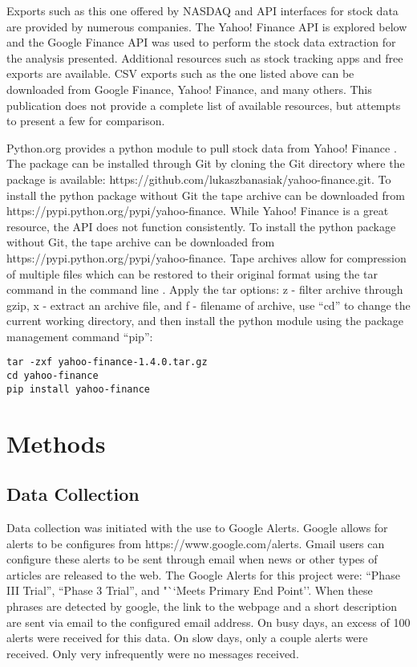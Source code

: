 \documentclass[sigconf]{acmart}
\begin{document}
Exports such as this one offered by NASDAQ and API interfaces for stock data are provided by numerous companies. The Yahoo! Finance API is explored below and the Google Finance API was used to perform the stock data extraction for the analysis presented. Additional resources such as stock tracking apps and free exports are available. CSV exports such as the one listed above can be downloaded from Google Finance, Yahoo! Finance, and many others. This publication does not provide a complete list of available resources, but attempts to present a few for comparison. 

Python.org provides a python module to pull stock data from Yahoo! Finance \cite{www-python-yahoo}. The package can be installed through Git by cloning the Git directory where the package is available: https://github.com/lukaszbanasiak/yahoo-finance.git. To install the python package without Git the tape archive can be downloaded from https://pypi.python.org/pypi/yahoo-finance. While Yahoo! Finance is a great resource, the API does not function consistently. To install the python package without Git, the tape archive can be downloaded from https://pypi.python.org/pypi/yahoo-finance. Tape archives allow for compression of multiple files which can be restored to their original format using the tar command in the command line \cite{www-tar}.  Apply the tar options: z - filter archive through gzip, x - extract an archive file, and f - filename of archive, use ``cd'' to change the current working directory, and then install the python module using the package management command ``pip'':
\begin{mdframed}[style=default]
\begin{lstlisting}
tar -zxf yahoo-finance-1.4.0.tar.gz
cd yahoo-finance
pip install yahoo-finance
\end{lstlisting}
\end{mdframed}


\section{Methods}
\subsection{Data Collection}
Data collection was initiated with the use to Google Alerts. Google allows for alerts to be configures from https://www.google.com/alerts. Gmail users can configure these alerts to be sent through email when news or other types of articles are released to the web. The Google Alerts for this project were: ``Phase III Trial'', ``Phase 3 Trial'', and "``Meets Primary End Point''. When these phrases are detected by google, the link to the webpage and a short description are sent via email to the configured email address. On busy days, an excess of 100 alerts were received for this data. On slow days, only a couple alerts were received.  Only very infrequently were no messages received.
\end{document}
